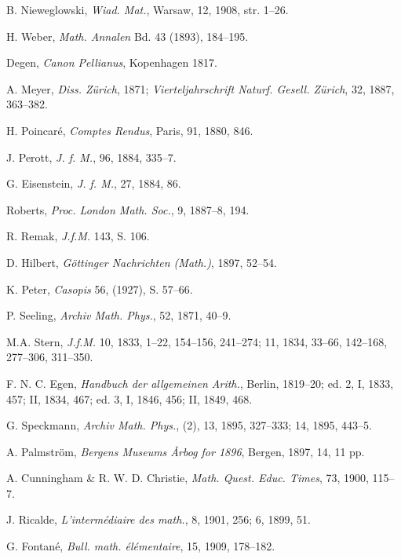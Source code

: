 \foreignlanguage{english}{B. Nieweglowski, \textit{Wiad. Mat.}, Warsaw, 12, 1908, str. 1--26.}

\foreignlanguage{english}{H. Weber, \textit{Math. Annalen} Bd. 43 (1893), 184--195.}

\foreignlanguage{english}{Degen, \textit{Canon Pellianus}, Kopenhagen 1817.}

\foreignlanguage{english}{A. Meyer, \textit{Diss. Z\"urich}, 1871; \textit{Vierteljahrschrift Naturf. Gesell. Z\"urich}, 32, 1887, 363--382.}

\foreignlanguage{english}{H. Poincar\'e, \textit{Comptes Rendus}, Paris, 91, 1880, 846.}

\foreignlanguage{english}{J. Perott, \textit{J. f. M.}, 96, 1884, 335--7.}

\foreignlanguage{english}{G. Eisenstein, \textit{J. f. M.}, 27, 1884, 86.}

\foreignlanguage{english}{Roberts, \textit{Proc. London Math. Soc.}, 9, 1887--8, 194.}

\foreignlanguage{english}{R. Remak, \textit{J.f.M.} 143, S. 106.}

\foreignlanguage{english}{D. Hilbert, \textit{G\"ottinger Nachrichten (Math.)}, 1897, 52--54.}

\foreignlanguage{english}{K. Peter, \textit{Casopis} 56, (1927), S. 57--66.}

\foreignlanguage{english}{P. Seeling, \textit{Archiv Math. Phys.}, 52, 1871, 40--9.}

\foreignlanguage{english}{M.A. Stern, \textit{J.f.M.} 10, 1833, 1--22, 154--156, 241--274; 11, 1834, 33--66, 142--168, 277--306, 311--350.}

\foreignlanguage{english}{F. N. C. Egen, \textit{Handbuch der allgemeinen Arith.}, Berlin, 1819--20; ed. 2, I, 1833, 457; II, 1834, 467; ed. 3, I, 1846, 456; II, 1849, 468.}

\foreignlanguage{english}{G. Speckmann, \textit{Archiv Math. Phys.}, (2), 13, 1895, 327--333; 14, 1895, 443--5.}

\foreignlanguage{english}{A. Palmstr\"om, \textit{Bergens Museums \r{A}rbog for 1896}, Bergen, 1897, 14, 11 pp.}

\foreignlanguage{english}{A. Cunningham \& R. W. D. Christie, \textit{Math. Quest. Educ. Times}, 73, 1900, 115--7.}

\foreignlanguage{english}{J. Ricalde, \textit{L'interm\'ediaire des math.}, 8, 1901, 256; 6, 1899, 51.}

\foreignlanguage{english}{G. Fontan\'e, \textit{Bull. math. \'el\'ementaire}, 15, 1909, 178--182.}

